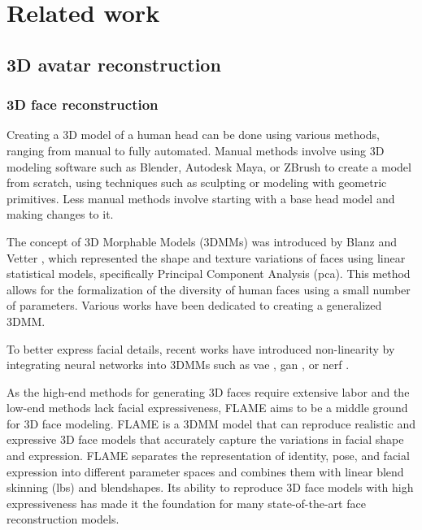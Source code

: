 \section{Related work}
\label{sec:related-work}

\subsection{3D avatar reconstruction}

\subsubsection{3D face reconstruction}

Creating a 3D model of a human head can be done using various methods, ranging from manual to fully automated. Manual methods involve using 3D modeling software such as Blender, Autodesk Maya, or ZBrush to create a model from scratch, using techniques such as sculpting or modeling with geometric primitives. Less manual methods involve starting with a base head model and making changes to it.

The concept of 3D Morphable Models (3DMMs) was introduced by Blanz and Vetter \cite{blanzMorphableModelSynthesis1999}, which represented the shape and texture variations of faces using linear statistical models, specifically Principal Component Analysis (\acrshort{pca}). This method allows for the formalization of the diversity of human faces using a small number of parameters. Various works \cite{paysan3DFaceModel2009,gerigMorphableFaceModels2018,caoFaceWarehouse3DFacial2014,liLearningModelFacial2017,yangFaceScapeLargeScaleHigh2020} have been dedicated to creating a generalized 3DMM.

To better express facial details, recent works have introduced non-linearity by integrating neural networks into 3DMMs such as \acrshort{vae} \cite{ranjanGenerating3DFaces2018}, \acrshort{gan} \cite{gecerFastGANFITGenerativeAdversarial2022}, or \acrshort{nerf} \cite{galanakis3DMMRFConvolutionalRadiance2023,hongHeadNeRFRealTimeNeRFBased2022}.


As the high-end methods for generating 3D faces require extensive labor and the low-end methods lack facial expressiveness, FLAME \cite{liLearningModelFacial2017} aims to be a middle ground for 3D face modeling. FLAME is a 3DMM model that can reproduce realistic and expressive 3D face models that accurately capture the variations in facial shape and expression. FLAME separates the representation of identity, pose, and facial expression into different parameter spaces and combines them with linear blend skinning (\acrshort{lbs}) and blendshapes. Its ability to reproduce 3D face models with high expressiveness has made it the foundation for many state-of-the-art face reconstruction models.

